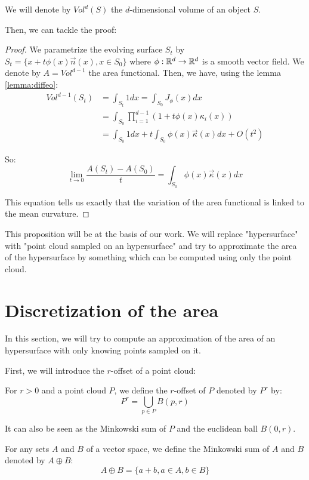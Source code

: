 We will denote by $ Vol^d(S) $ the $d$-dimensional volume of an object $ S
$.

Then, we can tackle the proof:

\begin{proof}
    We parametrize the evolving surface $ S_t $ by $ S_t = \{ x + t \phi(x)
    \vec{n}(x), x \in S_0\} $ where $ \phi : \mathbb{R}^d \rightarrow \mathbb{R}^d $ is a smooth
    vector field. We denote by $ A = Vol^{d-1} $ the area functional.
    Then, we have, using the lemma \ref{lemma:diffeo}:
    \begin{align*}
        Vol^{d-1}(S_t) &= \int_{S_t} 1 dx = \int_{S_0} J_{\phi}(x) dx \\
        &= \int_{S_0} \prod_{i=1}^{d-1} (1 + t \phi(x) \kappa_i(x)) \\
        &= \int_{S_0} 1dx + t \int_{S_0} \phi(x) \vec{\kappa}(x) dx + O(t^2)
    \end{align*}

    So:
    $$ \lim\limits_{t \to 0} \frac{A(S_t) - A(S_0)}{t}= \int_{S_0}
    \phi(x) \vec{\kappa}(x) dx $$

    This equation tells us exactly that the variation of the area functional is
    linked to the mean curvature.
\end{proof}

This proposition will be at the basis of our work. We will replace "hypersurface"
with "point cloud sampled on an hypersurface" and try to approximate the area of
the hypersurface by something which can be computed using only the point cloud.

\section{Discretization of the area}

In this section, we will try to compute an approximation of the area of an
hypersurface with only knowing points sampled on it.

First, we will introduce the $r$-offset of a point cloud:

\begin{definition}
    For $ r > 0 $ and a point cloud $ P $, we define the $r$-offset of $ P $
    denoted by $ P^r $ by:
    $$ P^r = \bigcup_{p \in P} B(p, r)$$
\end{definition}

It can also be seen as the Minkowski sum of $ P $ and the euclidean ball $ B(0,
r) $.

\begin{definition}
    For any sets $ A $ and $ B $ of a vector space, we define the Minkowski sum
    of $ A $ and $ B $ denoted by $ A \oplus B $:
    $$ A \oplus B = \{ a + b, a \in A, b \in B \} $$
\end{definition}

